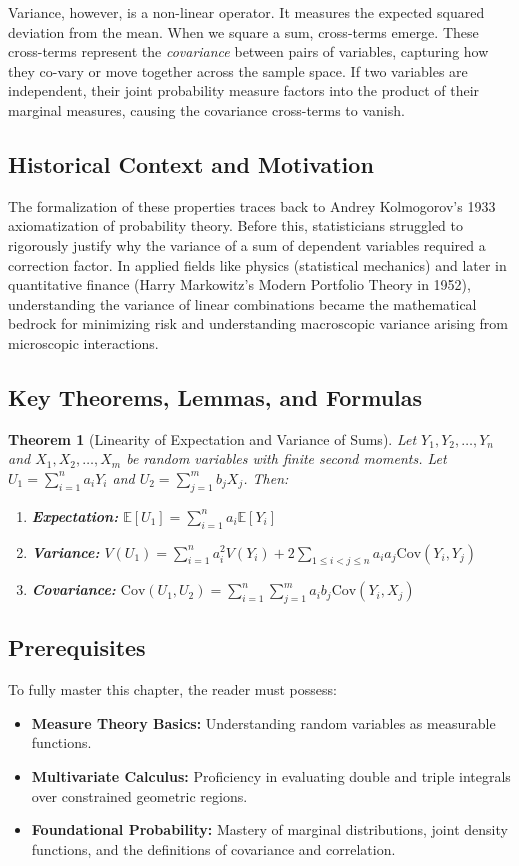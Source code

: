 \documentclass[11pt, a4paper]{article}
\newtheorem{theorem}{Theorem}[section]
\theoremstyle{definition}
\theoremstyle{remark}
\newcommand{\E}{\mathbb{E}}
\begin{document}
Variance, however, is a non-linear operator. It measures the expected squared deviation from the mean. When we square a sum, cross-terms emerge. These cross-terms represent the \textit{covariance} between pairs of variables, capturing how they co-vary or move together across the sample space. If two variables are independent, their joint probability measure factors into the product of their marginal measures, causing the covariance cross-terms to vanish.

\subsection{Historical Context and Motivation}
The formalization of these properties traces back to Andrey Kolmogorov's 1933 axiomatization of probability theory. Before this, statisticians struggled to rigorously justify why the variance of a sum of dependent variables required a correction factor. In applied fields like physics (statistical mechanics) and later in quantitative finance (Harry Markowitz's Modern Portfolio Theory in 1952), understanding the variance of linear combinations became the mathematical bedrock for minimizing risk and understanding macroscopic variance arising from microscopic interactions.

\subsection{Key Theorems, Lemmas, and Formulas}
\begin{theorem}[Linearity of Expectation and Variance of Sums]
Let $Y_1, Y_2, \dots, Y_n$ and $X_1, X_2, \dots, X_m$ be random variables with finite second moments. Let $U_1 = \sum_{i=1}^n a_i Y_i$ and $U_2 = \sum_{j=1}^m b_j X_j$. Then:
\begin{enumerate}
    \item \textbf{Expectation:} $\E[U_1] = \sum_{i=1}^n a_i \E[Y_i]$
    \item \textbf{Variance:} $V(U_1) = \sum_{i=1}^n a_i^2 V(Y_i) + 2 \sum_{1 \le i < j \le n} a_i a_j \text{Cov}(Y_i, Y_j)$
    \item \textbf{Covariance:} $\text{Cov}(U_1, U_2) = \sum_{i=1}^n \sum_{j=1}^m a_i b_j \text{Cov}(Y_i, X_j)$
\end{enumerate}
\end{theorem}

\subsection{Prerequisites}
To fully master this chapter, the reader must possess:
\begin{itemize}
    \item \textbf{Measure Theory Basics:} Understanding random variables as measurable functions.
    \item \textbf{Multivariate Calculus:} Proficiency in evaluating double and triple integrals over constrained geometric regions.
    \item \textbf{Foundational Probability:} Mastery of marginal distributions, joint density functions, and the definitions of covariance and correlation.
\end{itemize}
\end{document}
